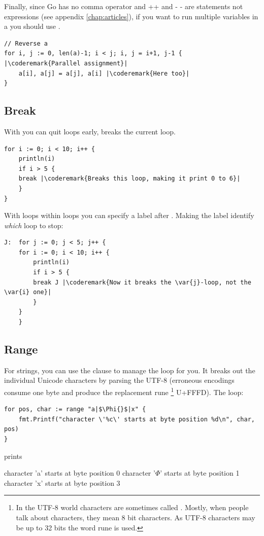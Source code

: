 Finally, since Go has no comma operator and ++ and - - are statements not
expressions (see appendix \ref{chap:articles}), if you want to run multiple variables in a  you should
use .
\begin{lstlisting}
// Reverse a
for i, j := 0, len(a)-1; i < j; i, j = i+1, j-1 { |\coderemark{Parallel assignment}|
    a[i], a[j] = a[j], a[i] |\coderemark{Here too}|
}
\end{lstlisting}

\subsection{Break}
With  you can quit loops early,  breaks
the current loop.
\begin{lstlisting}
for i := 0; i < 10; i++ {
    println(i)
    if i > 5 {
	break |\coderemark{Breaks this loop, making it print 0 to 6}|
    }
}
\end{lstlisting}
With loops within loops you can specify a label after .
Making the label identify \emph{which} loop to stop:
\begin{lstlisting}
J:  for j := 0; j < 5; j++ {
	for i := 0; i < 10; i++ {
	    println(i)
	    if i > 5 { 
		break J	|\coderemark{Now it breaks the \var{j}-loop, not the \var{i} one}|
	    }
	}
    } 
\end{lstlisting}

\subsection{Range}
For strings, you can use the  clause to manage the loop for
you. It breaks out the individual Unicode characters by parsing the UTF-8 (erroneous encodings consume one
byte and produce the replacement rune \footnote{In the UTF-8 world characters are
sometimes called . Mostly, when people talk about
characters, they mean 8 bit characters. As UTF-8 characters may be up to 32 bits the word
rune is used.} U+FFFD). The loop:

\begin{lstlisting}
for pos, char := range "a|$\Phi{}$|x" {
    fmt.Printf("character \'%c\' starts at byte position %d\n", char, pos)
}
\end{lstlisting}
prints
\begin{display}
character 'a' starts at byte position 0
character '\begin{math}\Phi\end{math}' starts at byte position 1
character 'x' starts at byte position 3
\end{display}

